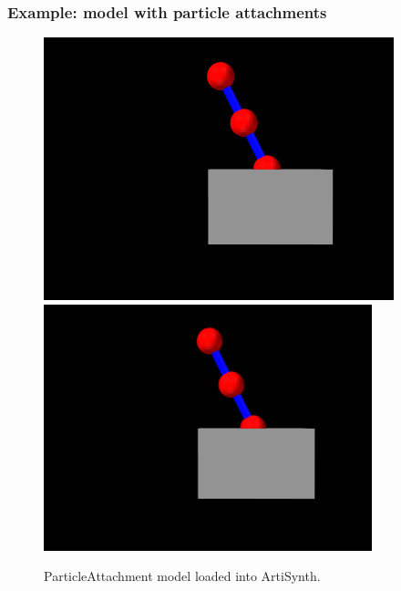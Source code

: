 \subsubsection{Example: model with particle attachments}

\begin{figure}[h]
\begin{center}
\iflatexml
 \includegraphics[]{images/ParticleAttachment}
\else
 \includegraphics[width=3.75in]{images/ParticleAttachment}
\fi
\end{center}
\caption{ParticleAttachment model loaded into ArtiSynth.}
\label{ParticleAttachment:fig}
\end{figure}

